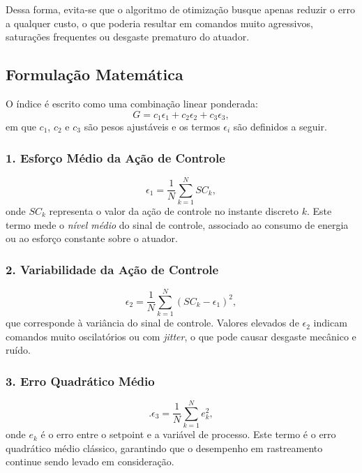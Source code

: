 \documentclass[12pt,a4paper]{article}
\begin{document}
Dessa forma, evita-se que o algoritmo de otimização busque apenas reduzir o erro a qualquer custo, o que poderia resultar em comandos muito agressivos, saturações frequentes ou desgaste prematuro do atuador.

\subsection{Formulação Matemática}

O índice é escrito como uma combinação linear ponderada:
\begin{equation}
    G = c_1 \epsilon_1 + c_2 \epsilon_2 + c_3 \epsilon_3,
\end{equation}
em que $c_1$, $c_2$ e $c_3$ são pesos ajustáveis e os termos $\epsilon_i$ são definidos a seguir.

\subsubsection*{1. Esforço Médio da Ação de Controle}

\begin{equation}
    \epsilon_1 = \frac{1}{N}\sum_{k=1}^{N} SC_k,
\end{equation}
onde $SC_k$ representa o valor da ação de controle no instante discreto $k$. Este termo mede o \emph{nível médio} do sinal de controle, associado ao consumo de energia ou ao esforço constante sobre o atuador.

\subsubsection*{2. Variabilidade da Ação de Controle}

\begin{equation}
    \epsilon_2 = \frac{1}{N}\sum_{k=1}^{N} (SC_k - \epsilon_1)^2,
\end{equation}
que corresponde à variância do sinal de controle. Valores elevados de $\epsilon_2$ indicam comandos muito oscilatórios ou com \emph{jitter}, o que pode causar desgaste mecânico e ruído.

\subsubsection*{3. Erro Quadrático Médio}

\begin{equation}.
    \epsilon_3 = \frac{1}{N}\sum_{k=1}^{N} e_k^2,
\end{equation}
onde $e_k$ é o erro entre o setpoint e a variável de processo. Este termo é o erro quadrático médio clássico, garantindo que o desempenho em rastreamento continue sendo levado em consideração.
\end{document}
